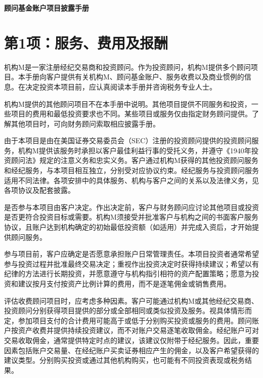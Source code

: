 \documentclass[UTF8,fontset=none,11pt,a4paper]{ctexart}
\begin{document}
{\noindent\fontsize{20}{25}\selectfont\bfseries 顾问基金账户项目披露手册\par}
\vspace{10pt}
\section*{第1项：服务、费用及报酬}
机构M是一家注册经纪交易商和投资顾问。作为投资顾问，机构M提供多个顾问项目。本手册向客户提供有关机构M、顾问基金账户、服务收费以及商业惯例的信息。在决定投资本项目前，应认真阅读本手册并咨询税务\allowbreak\mbox{专业人士。}


机构M提供的其他顾问项目不在本手册中说明。其他项目提供不同服务和投资，一些项目的费用和最低投资要求也不同。某些项目或服务仅由指定财务顾问提供。了解其他项目时，可向财务顾问索取相应\allowbreak\mbox{披露手册。}


由于本项目是由在美国证券交易委员会（SEC）注册的投资顾问提供的投资顾问服务，机构M提供该服务时承担以客户最佳利益行事的受托义务，并遵守《1940年投资顾问法》规定的注意义务和忠实义务。客户通过机构M获得的其他投资顾问服务和经纪服务，与本项目相互独立，分别受对应协议约束。经纪服务与投资顾问服务适用不同法律。各项安排中的具体服务、机构与客户之间的关系以及法律义务，见各项协议及配\allowbreak\mbox{套披露。}


是否参与本项目由客户决定。作出决定前，客户与财务顾问应讨论其他项目或投资是否更符合投资目标或需要。机构M须接受并批准客户与机构之间的书面客户服务协议，且账户达到机构确定的初始最低投资额（如适用）并完成入资后，才开始提供\allowbreak\mbox{顾问服务。}


参与项目前，客户应确定是否愿意承担账户日常管理责任。本项目投资者通常希望参与投资过程并批准最终交易决定；重视作出投资决定时获得持续建议；希望以有纪律的方法进行长期投资，并愿意遵守与机构指引相符的资产配置策略；愿意为投资和建议按月支付按资产比例计算的费用，而不是逐笔佣金或\allowbreak\mbox{销售费用。}


评估收费顾问项目时，应考虑多种因素。客户可能通过机构M或其他经纪交易商、投资顾问分别获得项目提供的部分或全部相同或类似投资及服务。视具体情形而定，参加项目支付的合计费用可能高于或低于分别购买投资或服务的费用。顾问账户按资产收费并提供持续投资建议，而不对账户交易逐笔收取佣金。经纪账户可对交易收取佣金，通常提供特定时点的建议，该建议仅附带于经纪服务。因此，重要因素包括账户交易量、在经纪账户买卖证券相应产生的佣金，以及客户希望获得的建议类型。分别购买投资或通过其他机构购买，也可能有不同投资表现或\allowbreak\mbox{税务结果。}
\end{document}
